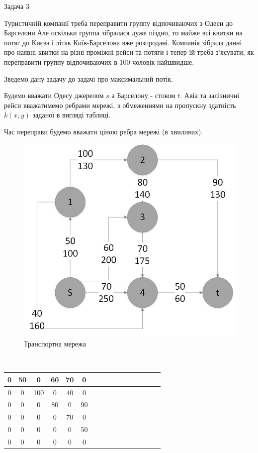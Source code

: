 \documentclass[a4paper,14pt,russian,ukrainian,oneside,final]{extreport}
\begin{document}
Задача 3

\indent
Туристичній компанії треба переправити группу відпочиваючих з Одеси до Барселони.Але оскільки группа зібралася дуже піздно, то майже всі квитки на потяг до Києва і літак Київ-Барселона вже розпродані. Компанія зібрала данні про наявні квитки на різні проміжні рейси та потяги і тепер їй треба з'ясувати, як переправити группу відпочиваючих в 100 чоловік найшвидше.

\indent
Зведемо дану задачу до задачі про максимальний потік.
\par Будемо вважати Одесу джерелом $s$ а Барселону - стоком $t$. Авіа та залізничні рейси вважатимемо ребрами мережі, з обмеженнями на пропускну здатність $k(x,y)$ заданої в вигляді таблиці.
\par Час переправи будемо вважати ціною ребра мережі (в хвилинах).
\begin{figure}[h]
\begin{center}
\includegraphics[scale=0.6]{G3.jpg}
\caption{Транспортна мережа}
\end{center}
\end{figure}
\\
\begin{center}
\begin{tabular}{|c|c|c|c|c|c|c|c|c|c|c|c|c|c|c|c|}
\hline
0&50&0&60&70&0     \\ \hline
0&0&100&0&40&0     \\ \hline
0&0&0&80&0&90      \\ \hline
0&0&0&0&70&0       \\ \hline
0&0&0&0&0&50       \\ \hline
0&0&0&0&0&0        \\ \hline
\end{tabular}
\end{center}
\end{document}
